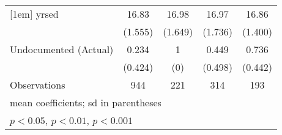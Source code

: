 \begin{table}[htbp]
\begin{tabular}{l*{4}{c}}
[1em]
yrsed               &       16.83         &       16.98         &       16.97         &       16.86         \\
                    &     (1.555)         &     (1.649)         &     (1.736)         &     (1.400)         \\
[1em]
Undocumented (Actual)&       0.234         &           1         &       0.449         &       0.736         \\
                    &     (0.424)         &         (0)         &     (0.498)         &     (0.442)         \\
\hline
Observations        &         944         &         221         &         314         &         193         \\
\hline\hline
\multicolumn{5}{l}{\footnotesize mean coefficients; sd in parentheses}\\
\multicolumn{5}{l}{\footnotesize \sym{*} \(p<0.05\), \sym{**} \(p<0.01\), \sym{***} \(p<0.001\)}\\
\end{tabular}
\end{table}
